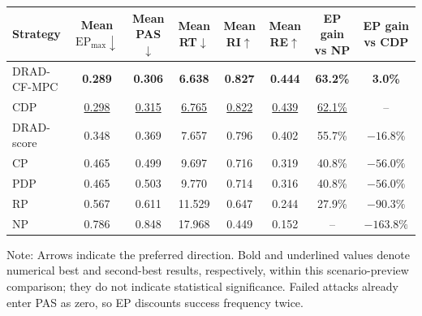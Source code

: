 \documentclass[10pt]{article}
\makeatletter
\newcommand{\best}[1]{\textbf{#1}}
\newcommand{\second}[1]{\underline{#1}}
\newenvironment{threeparttable}{}{}
\newenvironment{tablenotes}[1][]{\par\vspace{2pt}\begin{minipage}{.98\linewidth}\begin{list}{}{\leftmargin=0pt\labelwidth=0pt\itemsep=0pt\parsep=0pt}}{\end{list}\end{minipage}}
\newenvironment{exporttable}{\par\noindent\begin{minipage}{\linewidth}\def\@captype{table}}{\end{minipage}\par}
\makeatother
\begin{document}
\begin{exporttable}
\centering
\small
\begin{threeparttable}
\caption{Comprehensive policy-library scenario-preview comparison. EP is the success-discounted composite score; PAS and RT/RI/RE are service and algebraic recovery proxies.}
\label{tab:main_performance_summary}
\begin{tabular}{lccccccc}
\toprule
\rowcolor{TableHeader}
Strategy 
& Mean $\mathrm{EP}_{\max}\downarrow$ 
& Mean PAS$\downarrow$ 
& Mean RT$\downarrow$ 
& Mean RI$\uparrow$ 
& Mean RE$\uparrow$
& EP gain vs NP
& EP gain vs CDP \\
\midrule
\rowcolor{RowProposed}
DRAD-CF-MPC 
& \best{0.289} 
& \best{0.306} 
& \best{6.638} 
& \best{0.827} 
& \best{0.444} 
& \best{63.2\%} 
& \best{3.0\%} \\
\rowcolor{RowBaseline}
CDP         
& \second{0.298} 
& \second{0.315} 
& \second{6.765} 
& \second{0.822} 
& \second{0.439} 
& \second{62.1\%} 
& -- \\
\rowcolor{RowRisk}
DRAD-score        
& 0.348 
& 0.369 
& 7.657 
& 0.796 
& 0.402 
& 55.7\% 
& $-16.8\%$ \\
\rowcolor{RowPhysical}
CP          
& 0.465 
& 0.499 
& 9.697 
& 0.716 
& 0.319 
& 40.8\% 
& $-56.0\%$ \\
\rowcolor{RowPhysical}
PDP         
& 0.465 
& 0.503 
& 9.770 
& 0.714 
& 0.316 
& 40.8\% 
& $-56.0\%$ \\
\rowcolor{RowNeutral}
RP          
& 0.567 
& 0.611 
& 11.529 
& 0.647 
& 0.244 
& 27.9\% 
& $-90.3\%$ \\
\rowcolor{RowWeak}
NP          
& 0.786 
& 0.848 
& 17.968 
& 0.449 
& 0.152 
& -- 
& $-163.8\%$ \\
\bottomrule
\end{tabular}
\begin{tablenotes}
\footnotesize
\item Note: Arrows indicate the preferred direction. Bold and underlined values denote numerical best and second-best results, respectively, within this scenario-preview comparison; they do not indicate statistical significance. Failed attacks already enter PAS as zero, so EP discounts success frequency twice.
\end{tablenotes}
\end{threeparttable}
\end{exporttable}
\clearpage
\setcounter{table}{4}
\end{document}
